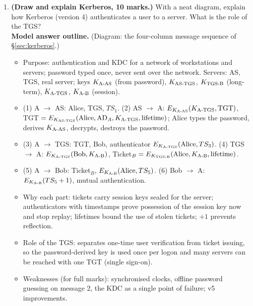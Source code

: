 \begin{enumerate}[leftmargin=1.6em,itemsep=4pt]
  \item \textbf{(Draw and explain Kerberos, 10 marks.)} With a neat diagram, explain how Kerberos (version 4) authenticates a user to a server. What is the role of the TGS?\\
  \textbf{Model answer outline.} (Diagram: the four-column message sequence of \S\ref{sec:kerberos}.)
  \begin{itemize}
    \item Purpose: authentication and KDC for a network of workstations and servers; password typed once, never sent over the network. Servers: AS, TGS, real server; keys $K_{\text{A-AS}}$ (from password), $K_{\text{AS-TGS}}$, $K_{\text{TGS-B}}$ (long-term), $K_{\text{A-TGS}}$, $K_{\text{A-B}}$ (session).
    \item (1) A $\to$ AS: Alice, TGS, $TS_1$. (2) AS $\to$ A: $E_{K_{\text{A-AS}}}(K_{\text{A-TGS}}, \text{TGT})$, TGT $= E_{K_{\text{AS-TGS}}}(\text{Alice}, \text{AD}_A, K_{\text{A-TGS}}, \text{lifetime})$; Alice types the password, derives $K_{\text{A-AS}}$, decrypts, destroys the password.
    \item (3) A $\to$ TGS: TGT, Bob, authenticator $E_{K_{\text{A-TGS}}}(\text{Alice}, TS_3)$. (4) TGS $\to$ A: $E_{K_{\text{A-TGS}}}(\text{Bob}, K_{\text{A-B}})$, Ticket$_B = E_{K_{\text{TGS-B}}}(\text{Alice}, K_{\text{A-B}}, \text{lifetime})$.
    \item (5) A $\to$ Bob: Ticket$_B$, $E_{K_{\text{A-B}}}(\text{Alice}, TS_5)$. (6) Bob $\to$ A: $E_{K_{\text{A-B}}}(TS_5 + 1)$, mutual authentication.
    \item Why each part: tickets carry session keys sealed for the server; authenticators with timestamps prove possession of the session key now and stop replay; lifetimes bound the use of stolen tickets; $+1$ prevents reflection.
    \item Role of the TGS: separates one-time user verification from ticket issuing, so the password-derived key is used once per logon and many servers can be reached with one TGT (single sign-on).
    \item Weaknesses (for full marks): synchronised clocks, offline password guessing on message 2, the KDC as a single point of failure; v5 improvements.
  \end{itemize}


\end{enumerate}
